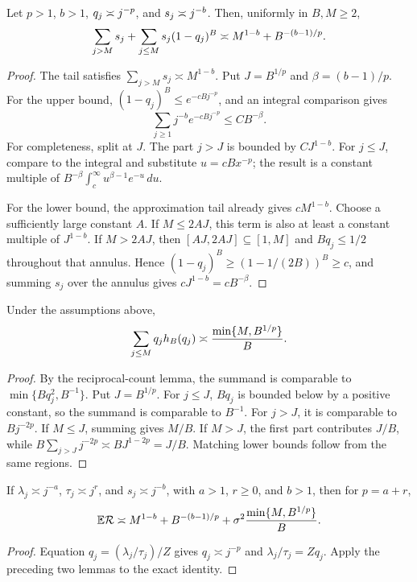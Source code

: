 \begin{lemma}
Let $p>1$, $b>1$, $q_j\mathrel{\asymp} j^{-p}$, and
$s_j\mathrel{\asymp} j^{-b}$. Then, uniformly in $B,M\ge2$,
\[
\sum_{j>M}s_j+\sum_{j\le M}s_j(1-q_j)^B
\mathrel{\asymp} M^{1-b}+B^{-(b-1)/p}.
\]
\end{lemma}

\begin{proof}
The tail satisfies $\sum_{j>M}s_j\asymp M^{1-b}$. Put $J=B^{1/p}$ and
$\beta=(b-1)/p$. For the upper bound, $(1-q_j)^B\le e^{-cBj^{-p}}$, and an
integral comparison gives
\[
\sum_{j\ge1}j^{-b}e^{-cBj^{-p}}
\le C B^{-\beta}.
\]
For completeness, split at $J$. The part $j>J$ is bounded by $CJ^{1-b}$.
For $j\le J$, compare to the integral and substitute $u=cBx^{-p}$; the result
is a constant multiple of
$B^{-\beta}\int_c^\infty u^{\beta-1}e^{-u}\,du$.

For the lower bound, the approximation tail already gives $cM^{1-b}$.
Choose a sufficiently large constant $A$. If $M\le2AJ$, this term is also at
least a constant multiple of $J^{1-b}$. If $M>2AJ$, then
$[AJ,2AJ]\subseteq[1,M]$ and $Bq_j\le1/2$ throughout that annulus. Hence
$(1-q_j)^B\ge(1-1/(2B))^B\ge c$, and summing $s_j$ over the annulus gives
$cJ^{1-b}=cB^{-\beta}$.
\end{proof}

\begin{lemma}
Under the assumptions above,
\[
\sum_{j\le M}q_jh_B(q_j)
\mathrel{\asymp} \frac{\min\{M,B^{1/p}\}}{B}.
\]
\end{lemma}

\begin{proof}
By the reciprocal-count lemma, the summand is comparable to
$\min\{Bq_j^2,B^{-1}\}$. Put $J=B^{1/p}$. For $j\le J$, $Bq_j$ is bounded
below by a positive constant, so the summand is comparable to $B^{-1}$. For
$j>J$, it is comparable to $Bj^{-2p}$. If $M\le J$, summing gives $M/B$.
If $M>J$, the first part contributes $J/B$, while
$B\sum_{j>J}j^{-2p}\asymp BJ^{1-2p}=J/B$. Matching lower bounds follow from
the same regions.
\end{proof}

\begin{theorem}
If $\lambda_j\asymp j^{-a}$, $\tau_j\asymp j^r$, and
$s_j\asymp j^{-b}$, with $a>1$, $r\ge0$, and $b>1$, then for
$p=a+r$,
\[
\mathbb{E}\mathcal{R}\mathrel{\asymp} M^{1-b}+B^{-(b-1)/p}
+\sigma^2\frac{\min\{M,B^{1/p}\}}{B}.
\]
\end{theorem}

\begin{proof}
Equation $q_j=(\lambda_j/\tau_j)/Z$ gives $q_j\asymp j^{-p}$ and
$\lambda_j/\tau_j=Zq_j$. Apply the preceding two lemmas to the exact identity.
\end{proof}
